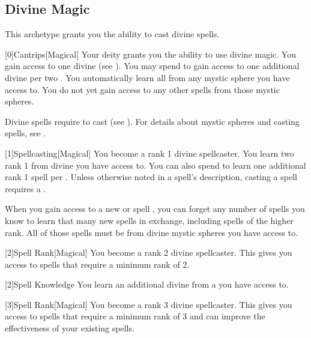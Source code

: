     \newpage
    \subsection{Divine Magic}
        This archetype grants you the ability to cast divine spells.

        [0]{Cantrips}[Magical]
        Your deity grants you the ability to use divine magic.
        You gain access to one divine  (see ).
        You may spend  to gain access to one additional divine  per two .
        You automatically learn all  from any mystic sphere you have access to.
        You do not yet gain access to any other spells from those mystic spheres.

        Divine spells require  to cast (see ).
        For details about mystic spheres and casting spells, see .

        [1]{Spellcasting}[Magical]
        You become a rank 1 divine spellcaster.
        You learn two rank 1  from divine  you have access to.
        You can also spend  to learn one additional rank 1 spell per .
        Unless otherwise noted in a spell's description, casting a spell requires a .

        When you gain access to a new  or spell ,
            you can forget any number of spells you know to learn that many new spells in exchange,
            including spells of the higher rank.
        All of those spells must be from divine mystic spheres you have access to.

        [2]{Spell Rank}[Magical] You become a rank 2 divine spellcaster.
        This gives you access to spells that require a minimum rank of 2.

        [2]{Spell Knowledge} You learn an additional divine  from a  you have access to.

        [3]{Spell Rank}[Magical] You become a rank 3 divine spellcaster.
        This gives you access to spells that require a minimum rank of 3 and can improve the effectiveness of your existing spells.

